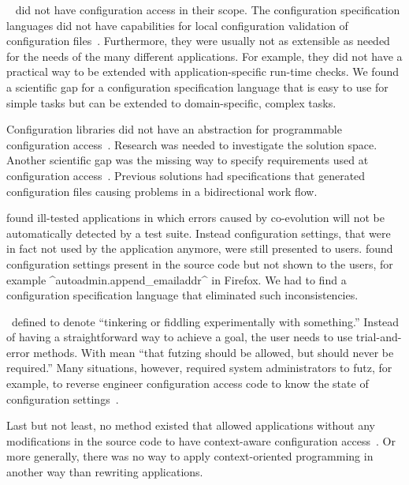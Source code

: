 ~\cite{gunther2012software,berger2013survey,hewson2011modelling,magableh2010primitive,friedrich1999consistency} did not have configuration access in their scope.
The configuration specification languages did not have capabilities for local configuration validation of configuration files~\cite{raab2015safe}.
Furthermore, they were usually not as extensible as needed for the needs of the many different applications.
For example, they did not have a practical way to be extended with application-specific run-time checks.
We found a scientific gap for a configuration specification language that is easy to use for simple tasks but can be extended to domain-specific, complex tasks.%
{\parfillskip=0pt \par}

Configuration libraries did not have an abstraction for programmable configuration access~\cite{raab2017challenges,raab2016improving}.
Research was needed to investigate the solution space.
Another scientific gap was the missing way to specify requirements used at configuration access~\cite{raab2016improving}.
Previous solutions had specifications that generated configuration files causing problems in a bidirectional work flow.

\citet{behrang2015users} found ill-tested applications in which errors caused by co-evolution will not be automatically detected by a test suite.
Instead configuration settings, that were in fact not used by the application anymore, were still presented to users.
\citet{jin2014configurations} found configuration settings present in the source code but not shown to the users, for example ^autoadmin.append_emailaddr^ in Firefox.
We had to find a configuration specification language that eliminated such inconsistencies.

\citet{holland2001nofutz}~defined  to denote \enquote{tinkering or fiddling experimentally with something.}
Instead of having a straightforward way to achieve a goal, the user needs to use trial-and-error methods.
With  \citet{holland2001nofutz} mean \enquote{that futzing should be allowed, but should never be required.}
Many situations, however, required system administrators to futz, for example, to reverse engineer configuration access code to know the state of configuration settings~\cite{holland2001nofutz}.

Last but not least, no method existed that allowed applications without any modifications in the source code to have context-aware configuration access~\cite{raab2016unanticipated}.
Or more generally, there was no way to apply context-oriented programming in another way than rewriting applications.


